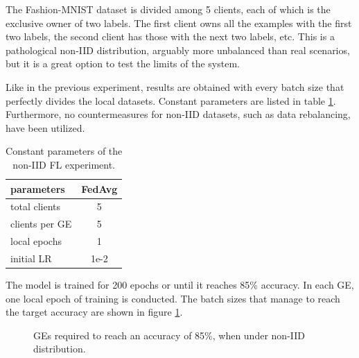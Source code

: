 The Fashion-MNIST dataset is divided among 5 clients, each of which is the exclusive owner of two labels. The first client owns all the examples with the first two labels, the second client has those with the next two labels, etc. This is a pathological non-IID distribution, arguably more unbalanced than real scenarios, but it is a great option to test the limits of the system. %

Like in the previous experiment, results are obtained with every batch size that perfectly divides the local datasets. Constant parameters are listed in table \ref{table: Non-IID experiment parameters}. Furthermore, no countermeasures for non-IID datasets, such as data rebalancing, have been utilized. %
\begin{table}[H]
    \center
    \begin{tabular}
        { | l | c | }
        \hline
        parameters & FedAvg\\\hline
        total clients   & 5\\\hline
        clients per GE  & 5\\\hline
        local epochs    & 1\\\hline
        initial LR      & 1e-2\\\hline
    \end{tabular}
    \caption[Non-IID experiment parameters]{Constant parameters of the non-IID FL experiment.}
    \label{table: Non-IID experiment parameters}
\end{table}

The model is trained for 200 epochs or until it reaches 85\% accuracy. In each GE, one local epoch of training is conducted. The batch sizes that manage to reach the target accuracy are shown in figure \ref{fig: nonIID, GEs per batch size}. %
\begin{figure}[H]
    \center
    \caption[ non-IID distribution, GEs per batch size ]{ GEs required to reach an accuracy of 85\%, when under non-IID distribution.}
    \label{fig: nonIID, GEs per batch size}
\end{figure}


